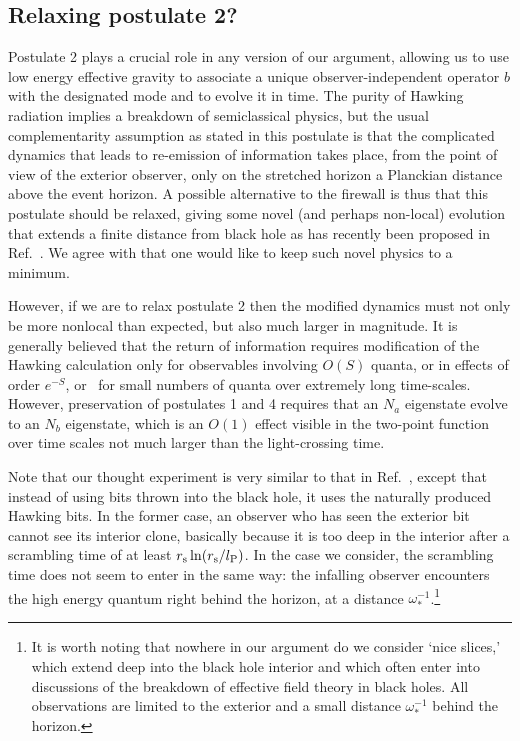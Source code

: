 \documentclass[12pt]{article}
\begin{document}
\subsection{Relaxing postulate 2?}

Postulate 2 plays a crucial role in any version of our argument, allowing us to use low energy effective gravity to {associate a unique observer-independent operator $b$ with the designated mode and to evolve it in time.}  The purity of Hawking radiation implies a breakdown of semiclassical physics, but the usual complementarity assumption as stated in this postulate is that the complicated dynamics that leads to re-emission of information takes place, from the point of view of the exterior observer, only on the stretched horizon a Planckian distance above the event horizon.  A possible alternative to the firewall is thus that this postulate should be relaxed, giving some
novel (and perhaps non-local) evolution that extends a finite distance from black hole as has recently been proposed in Ref.~\cite{Giddings:2011ks}.
We agree with \cite{Giddings:2011ks} that one would like to keep such novel physics to a minimum.

However, if we are to relax postulate 2 then the {modified} dynamics must not only be more nonlocal than expected, but also much larger in magnitude.  It is generally believed that the return of information requires modification of the Hawking calculation only for observables involving $O(S)$ quanta, or in effects of order $e^{-S}$, or~\cite{Maldacena:2001kr} for small numbers of quanta over extremely long time-scales.  However, preservation of postulates 1 and 4 requires that an $N_a$ eigenstate evolve to an $N_b$ eigenstate, which is an $O(1)$ effect visible in the two-point function over time scales not much larger than the light-crossing time.

Note that
{our thought experiment} is very similar to that in Ref.~\cite{Susskind:1993mu}, except that instead of using bits thrown into the black hole, it uses the naturally produced Hawking bits.  In the former case, an observer who has seen the exterior bit cannot see its interior clone, basically because it is too deep in the interior after a scrambling time of at least $r_{\rm s} \ln (r_{\rm s}/l_{\rm P})$.  In the case we consider, the scrambling time does not seem to enter in the same way: the infalling observer encounters the high energy quantum right behind the horizon, at a distance $\omega_*^{-1}$.\footnote{It is worth noting that nowhere in our argument do we consider `nice slices,' which extend deep into the black hole interior and which often enter into discussions of the breakdown of effective field theory in black holes.  All observations are limited to the exterior and a small distance $\omega_*^{-1}$ behind the horizon.}
\end{document}
